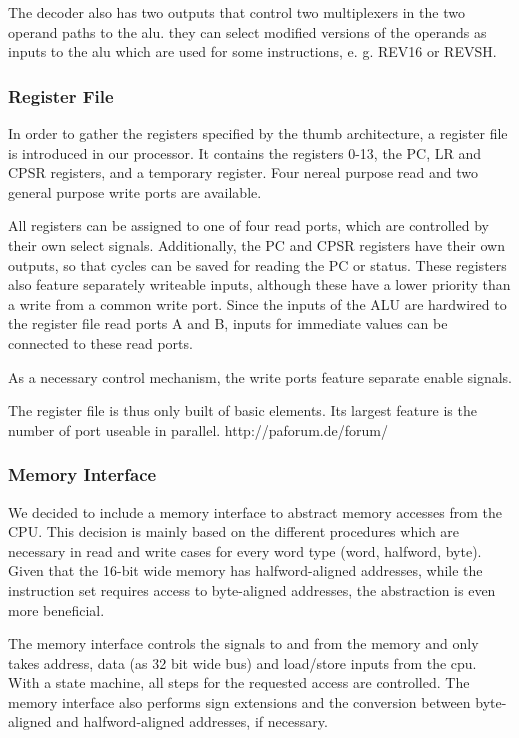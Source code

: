 The decoder also has two outputs that control two multiplexers in the two operand paths to the alu. they can select modified versions of the operands as inputs to the alu which are used for some instructions, e. g. REV16 or REVSH.

\subsubsection{Register File}
\label{subsubsec:regfisterfile}
In order to gather the registers specified by the thumb architecture, a register file is introduced in our processor. It contains the registers 0-13, the PC, LR and CPSR registers, and a temporary register. Four nereal purpose read and two general purpose write ports are available.

All registers can be assigned to one of four read ports, which are controlled by their own select signals. Additionally, the PC and CPSR registers have their own outputs, so that cycles can be saved for reading the PC or status. These registers also feature separately writeable inputs, although these have a lower priority than a write from a common write port.
Since the inputs of the ALU are hardwired to the register file read ports A and B, inputs for immediate values can be connected to these read ports.

As a necessary control mechanism, the write ports feature separate enable signals.

The register file is thus only built of basic elements. Its largest feature is the number of port useable in parallel. 
http://paforum.de/forum/
\subsubsection{Memory Interface}
\label{subsubsec:memoryinterface}
We decided to include a memory interface to abstract memory accesses from the CPU. This decision is mainly based on the different procedures which are necessary in read and write cases for every word type (word, halfword, byte). Given that the 16-bit wide memory has halfword-aligned addresses, while the instruction set requires access to byte-aligned addresses, the abstraction is even more beneficial. 

The memory interface controls the signals to and from the memory and only takes address, data (as 32 bit wide bus) and load/store inputs from the cpu. With a state machine, all steps for the requested access are controlled. The memory interface also performs sign extensions and the conversion between byte-aligned and halfword-aligned addresses, if necessary.

